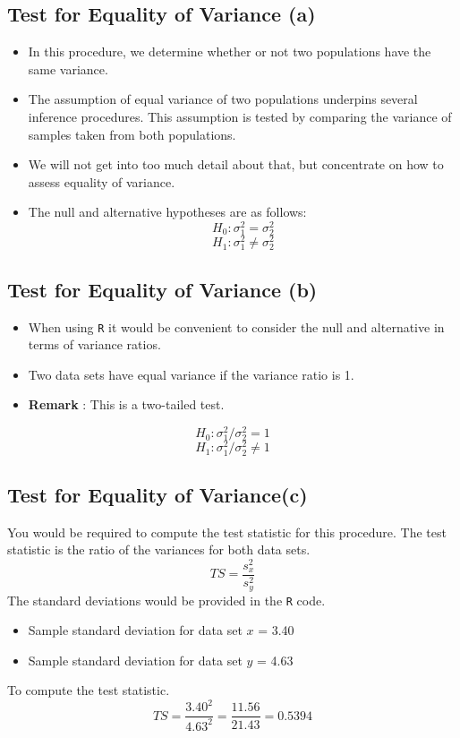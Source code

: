 \documentclass[]{report}
\begin{document}
\newpage


\subsection{Test for Equality of Variance (a)}
\begin{itemize}
	\item In this procedure, we determine whether or not two populations have the same variance.
	\item The assumption of equal variance of two populations underpins several inference procedures. This assumption is tested by comparing the variance of samples taken from both populations.
	\item We will not get into too much detail about that, but concentrate on how to assess equality of variance.
	\item The null and alternative hypotheses are as follows:
	\[ H_0: \sigma^2_1 = \sigma^2_2 \]
	\[ H_1: \sigma^2_1 \neq \sigma^2_2 \]
\end{itemize}



\subsection{Test for Equality of Variance (b)}
\begin{itemize}
	\item When using \texttt{R} it would be convenient to consider the null and alternative in terms of variance ratios.
	\item Two data sets have equal variance if the variance ratio is 1.
	\item \textbf{Remark} : This is a two-tailed test.
\end{itemize}

\[ H_0: \sigma^2_1 / \sigma^2_2 = 1 \]
\[ H_1: \sigma^2_1 / \sigma^2_2 \neq 1 \]


\subsection{Test for Equality of Variance(c)}
You would be required to compute the test statistic for this procedure.
The test statistic is the ratio of the variances for both data sets.
\[ TS = \frac{s^2_x}{s^2_y} \]
The standard deviations would be provided in the \texttt{R} code. \begin{itemize}
	\item Sample standard deviation for data set $x$ = 3.40
	\item Sample standard deviation for data set $y$ = 4.63
\end{itemize}
To compute the test statistic.
\[ TS = \frac{3.40^2}{4.63^2} = \frac{11.56}{21.43} = 0.5394 \]
\end{document}
